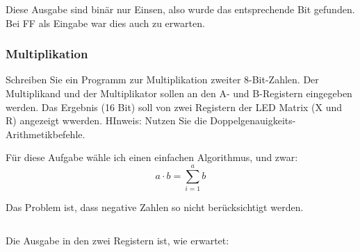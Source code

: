 \inputminted[fontsize=\small, linenos]{cpp}{../Prototypen/f.cpp}

\begin{multicols}{9}
	\inputminted[fontsize=\footnotesize]{text}{f.txt}
\end{multicols}

Diese Ausgabe sind binär nur Einsen, also wurde das entsprechende Bit gefunden.
Bei FF als Eingabe war dies auch zu erwarten.

\subsubsection{Multiplikation}

\begin{problem}
	Schreiben Sie ein Programm zur Multiplikation zweiter 8-Bit-Zahlen. Der
	Multiplikand und der Multiplikator sollen an den A- und B-Registern
	eingegeben werden. Das Ergebnis (16 Bit) soll von zwei Registern der LED
	Matrix (X und R) angezeigt wwerden. HInweis: Nutzen Sie die
	Doppelgenauigkeits-Arithmetikbefehle.
\end{problem}

Für diese Aufgabe wähle ich einen einfachen Algorithmus, und zwar:
\[
	a \cdot b = \sum_{i = 1}^{a} b
\]

Das Problem ist, dass negative Zahlen so nicht berücksichtigt werden.

\inputminted[fontsize=\small, linenos]{cpp}{../Prototypen/g.cpp}

Die Ausgabe in den zwei Registern ist, wie erwartet:

\begin{multicols}{9}
	\inputminted[fontsize=\footnotesize]{text}{g.txt}
\end{multicols}


\FloatBarrier
\IfFileExists{\bibliographyfile}{
	
}{}



